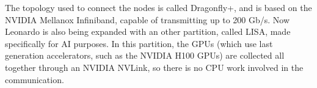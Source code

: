 The topology used to connect the nodes is called Dragonfly+, and is based on the NVIDIA Mellanox Infiniband, capable of transmitting up to 200 Gb/s.
\nwl
Now Leonardo is also being expanded with an other partition, called LISA, made specifically for AI purposes. In this partition, the GPUs (which use last generation accelerators, such as the NVIDIA H100 GPUs) are collected all together through an NVIDIA NVLink, so there is no CPU work involved in the communication. 